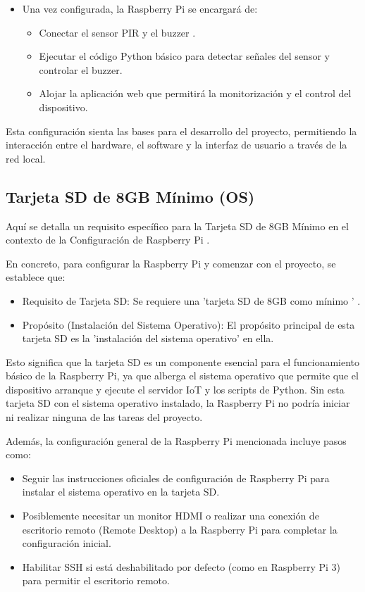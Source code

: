 \documentclass{report}
\begin{document}
\begin{itemize}
    \item Una vez configurada, la Raspberry Pi se encargará de:
    \begin{itemize}
        \item Conectar el  sensor PIR  y el  buzzer .
        \item Ejecutar el  código Python básico  para detectar señales del sensor y controlar el buzzer.
        \item Alojar la  aplicación web  que permitirá la monitorización y el control del dispositivo.
    \end{itemize}
\end{itemize}

Esta configuración sienta las bases para el desarrollo del proyecto, permitiendo la interacción entre el hardware, el software y la interfaz de 
usuario a través de la red local.

\subsection{Tarjeta SD de 8GB Mínimo (OS)}
Aquí se detalla un requisito específico para la  Tarjeta SD de 8GB Mínimo  en el contexto de la 
Configuración de Raspberry Pi .

En concreto, para configurar la Raspberry Pi y comenzar con el proyecto, se establece que:
\begin{itemize}
    \item Requisito de Tarjeta SD:  Se requiere una   'tarjeta SD de 8GB como mínimo ' .
    \item Propósito (Instalación del Sistema Operativo):  El propósito principal de esta tarjeta SD es la   'instalación del sistema operativo'  en ella.
\end{itemize}

Esto significa que la tarjeta SD es un componente esencial para el funcionamiento básico de la Raspberry Pi, ya que alberga el sistema operativo que 
permite que el dispositivo arranque y ejecute el servidor IoT y los scripts de Python. Sin esta tarjeta SD con el sistema operativo instalado, la 
Raspberry Pi no podría iniciar ni realizar ninguna de las tareas del proyecto.

Además, la configuración general de la Raspberry Pi mencionada incluye pasos como:
\begin{itemize}
    \item Seguir las instrucciones oficiales de configuración de Raspberry Pi para instalar el sistema operativo en la tarjeta SD.
    \item Posiblemente necesitar un monitor HDMI o realizar una conexión de escritorio remoto (Remote Desktop) a la Raspberry Pi para completar la 
    configuración inicial.
    \item Habilitar SSH si está deshabilitado por defecto (como en Raspberry Pi 3) para permitir el escritorio remoto.
\end{itemize}
\end{document}

